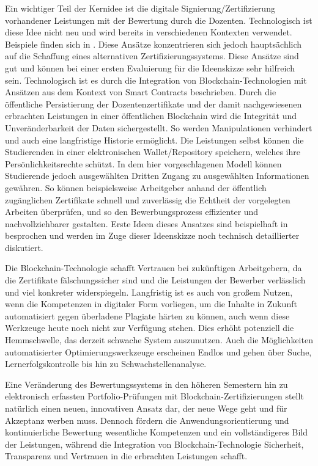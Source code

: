 \documentclass[conference]{IEEEtran}
\begin{document}
Ein wichtiger Teil der Kernidee ist die digitale Signierung/Zertifizierung vorhandener Leistungen mit der Bewertung durch die Dozenten.  Technologisch ist diese Idee nicht neu und wird bereits in verschiedenen Kontexten verwendet. Beispiele finden sich in \cite{alammary2019blockchain}. Diese Ansätze konzentrieren sich jedoch hauptsächlich auf die Schaffung eines alternativen Zertifizierungssystems. Diese Ansätze sind gut und können bei einer ersten Evaluierung für die Ideenskizze sehr hilfreich sein. Technologisch ist  es durch die Integration von Blockchain-Technologien mit Ansätzen aus dem Kontext von Smart Contracts beschrieben. Durch die öffentliche Persistierung der Dozentenzertifikate und der damit nachgewiesenen erbrachten Leistungen in einer öffentlichen Blockchain wird die Integrität und Unveränderbarkeit der Daten sichergestellt. So werden Manipulationen verhindert und auch eine langfristige Historie ermöglicht. Die Leistungen selbst können die Studierenden in einer elektronischen Wallet/Repository speichern, welches ihre Persönlichkeitsrechte schützt. In dem hier vorgeschlagenen Modell können Studierende jedoch ausgewählten Dritten Zugang zu ausgewählten Informationen gewähren.  So können beispielsweise Arbeitgeber anhand der öffentlich zugänglichen Zertifikate schnell und zuverlässig die Echtheit der vorgelegten Arbeiten überprüfen, und so  den Bewerbungsprozess effizienter und nachvollziehbarer gestalten. Erste Ideen dieses Ansatzes sind beispielhaft in \cite{Idee} besprochen und werden im Zuge dieser Ideenskizze noch technisch detaillierter diskutiert.

Die Blockchain-Technologie schafft Vertrauen bei zukünftigen Arbeitgebern, da die Zertifikate fälschungssicher sind und die Leistungen der Bewerber verlässlich und viel konkreter widerspiegeln. Langfristig ist es auch von großem Nutzen, wenn die Kompetenzen in digitaler Form vorliegen, um die Inhalte in Zukunft automatisiert gegen überladene Plagiate härten zu können, auch wenn diese Werkzeuge heute noch nicht zur Verfügung stehen. Dies erhöht potenziell die Hemmschwelle, das derzeit schwache System auszunutzen. Auch die Möglichkeiten automatisierter Optimierungswerkzeuge erscheinen Endlos und gehen über Suche, Lernerfolgskontrolle bis hin zu Schwachstellenanalyse. 

Eine Veränderung des Bewertungssystems in den höheren Semestern hin zu elektronisch erfassten Portfolio-Prüfungen mit Blockchain-Zertifizierungen stellt natürlich einen neuen, innovativen Ansatz dar, der neue Wege geht und für Akzeptanz werben muss. Dennoch fördern die Anwendungsorientierung und kontinuierliche Bewertung wesentliche Kompetenzen und ein vollständigeres Bild der Leistungen, während die Integration von Blockchain-Technologie Sicherheit, Transparenz und Vertrauen in die erbrachten Leistungen schafft.
\end{document}

